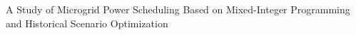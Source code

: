 A Study of Microgrid Power Scheduling Based on Mixed-Integer Programming and Historical Scenario Optimization
